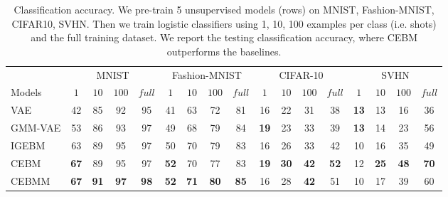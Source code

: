 \documentclass{article}
\begin{document}
\setlength{\tabcolsep}{5pt}
\begin{table}[!t]
\caption{Classification accuracy. We pre-train 5 unsupervised models (rows) on MNIST, Fashion-MNIST, CIFAR10, SVHN. Then we train logistic classifiers using 1, 10, 100 examples per class (i.e. shots) and the full training dataset. We report the testing classification accuracy, where CEBM outperforms the baselines.}
\centering
\begin{tabular}{l|cccc|cccc|cccc|cccc}
\toprule
 & \multicolumn{4}{c}{MNIST} & \multicolumn{4}{|c}{Fashion-MNIST} & \multicolumn{4}{|c}{CIFAR-10} & \multicolumn{4}{|c}{SVHN}\\
Models & $1$ & $10$  & $100$ & $full$ & $1$ & $10$  & $100$ & $full$ & $1$ & $10$  & $100$ & $full$ & $1$ & $10$  & $100$ & $full$ \\
\midrule
\midrule
VAE & 42 & 85 & 92 & 95 & 41 & 63 & 72 & 81 & 16 & 22 & 31 & 38 & \textbf{13} & 13 & 16 & 36\\
GMM-VAE & 53 & 86 & 93 & 97 & 49 & 68 & 79 & 84 & \textbf{19} & 23 & 33 & 39 & \textbf{13} & 14 & 23 & 56  \\
\midrule
IGEBM & 63 & 89 & 95 & 97 & 50 & 70 & 79 & 83 & 16 & 26 & 33 & 42 & 10 & 16 & 35 & 49\\
CEBM & \textbf{67} & 89 & 95 & 97 & \textbf{52} & 70 & 77 & 83 & \textbf{19} & \textbf{30} & \textbf{42} & \textbf{52} & 12 & \textbf{25} & \textbf{48} & \textbf{70}\\
CEBMM & \textbf{67} & \textbf{91} & \textbf{97} & \textbf{98} &\textbf{52} & \textbf{71} & \textbf{80} & \textbf{85} & 16 & 28 & \textbf{42} & 51 & 10 & 17 & 39 & 60 \\
\bottomrule
\end{tabular}
\label{tab:few-shot classification}
\end{table}
\end{document}
